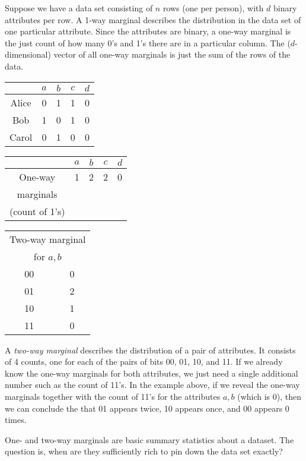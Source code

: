 \documentclass[11pt]{article}
\begin{document}
\begin{enumerate}[leftmargin=\parindent, itemsep=3ex]
  Suppose we have a data set consisting of $n$ rows (one per person), with $d$ binary attributes per row. A 1-way marginal describes the distribution in the data set of one particular attribute. Since the attributes are binary, a one-way marginal is the just count of how many 0's and 1's there are in a particular column. The ($d$-dimensional) vector of all one-way marginals is just the sum of the rows of the data. 

  \begin{center}
    \begin{tabular}{c||c|c|c|c|}
      & $a$ & $b$& $c$& $d$ \\
      \hline
      Alice & 0 & 1 & 1& 0\\
      Bob   & 1 & 0 & 1& 0\\
      Carol & 0 & 1 & 0 & 0\\    
      \hline
    \end{tabular}
    \hfill     
    \begin{tabular}{c||c|c|c|c|}
      & $a$ & $b$& $c$& $d$ \\
      \hline
      One-way  & 1 & 2 & 2& 0\\
      marginals & & & & \\
      (count of 1's) & & & & \\
    \end{tabular}
    \hfill
    \begin{tabular}{|c|c|}
      \multicolumn{2}{|c|}{Two-way marginal} \\
      \multicolumn{2}{|c|}{for $a,b$} \\
      \hline
      00 & 0\\
      01 & 2\\
      10 & 1 \\
      11 & 0\\
    \end{tabular}
  \end{center}
  

  A \emph{two-way marginal} describes the distribution of a pair of attributes. It consists of 4 counts, one for each of the pairs of bits 00, 01, 10, and 11. If we already know the one-way marginals for both attributes, we just need a single additional number such as the count of 11's. In the example above, if we reveal the one-way marginals together with the count of 11's for the attributes $a,b$ (which is 0), then we can conclude the that 01 appears twice, 10 appears once, and 00 appears 0 times. 

  One- and two-way marginals are basic summary statistics about a dataset. The question is, when are they sufficiently rich to pin down the data set exactly? 


\end{enumerate}
\end{document}

